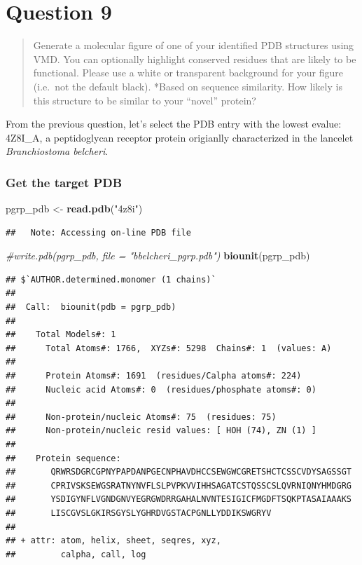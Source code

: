 \documentclass[]{article}
\newenvironment{Shaded}{\begin{snugshade}}{\end{snugshade}}
\newcommand{\KeywordTok}[1]{\textcolor[rgb]{0.13,0.29,0.53}{\textbf{#1}}}
\newcommand{\StringTok}[1]{\textcolor[rgb]{0.31,0.60,0.02}{#1}}
\newcommand{\CommentTok}[1]{\textcolor[rgb]{0.56,0.35,0.01}{\textit{#1}}}
\newcommand{\NormalTok}[1]{#1}
\begin{document}
\section{Question 9}\label{question-9}

\begin{quote}
Generate a molecular figure of one of your identified PDB structures
using VMD. You can optionally highlight conserved residues that are
likely to be functional. Please use a white or transparent background
for your figure (i.e.~not the default black). *Based on sequence
similarity. How likely is this structure to be similar to your ``novel''
protein?
\end{quote}

From the previous question, let's select the PDB entry with the lowest
evalue: 4Z8I\_A, a peptidoglycan receptor protein origianlly
characterized in the lancelet \emph{Branchiostoma belcheri}.

\subsubsection{Get the target PDB}\label{get-the-target-pdb}

\begin{Shaded}
\begin{Highlighting}[]
\NormalTok{pgrp_pdb <-}\StringTok{ }\KeywordTok{read.pdb}\NormalTok{(}\StringTok{"4z8i"}\NormalTok{)}
\end{Highlighting}
\end{Shaded}

\begin{verbatim}
##   Note: Accessing on-line PDB file
\end{verbatim}

\begin{Shaded}
\begin{Highlighting}[]
\CommentTok{#write.pdb(pgrp_pdb, file = "bbelcheri_pgrp.pdb")}
\KeywordTok{biounit}\NormalTok{(pgrp_pdb)}
\end{Highlighting}
\end{Shaded}

\begin{verbatim}
## $`AUTHOR.determined.monomer (1 chains)`
## 
##  Call:  biounit(pdb = pgrp_pdb)
## 
##    Total Models#: 1
##      Total Atoms#: 1766,  XYZs#: 5298  Chains#: 1  (values: A)
## 
##      Protein Atoms#: 1691  (residues/Calpha atoms#: 224)
##      Nucleic acid Atoms#: 0  (residues/phosphate atoms#: 0)
## 
##      Non-protein/nucleic Atoms#: 75  (residues: 75)
##      Non-protein/nucleic resid values: [ HOH (74), ZN (1) ]
## 
##    Protein sequence:
##       QRWRSDGRCGPNYPAPDANPGECNPHAVDHCCSEWGWCGRETSHCTCSSCVDYSAGSSGT
##       CPRIVSKSEWGSRATNYNVFLSLPVPKVVIHHSAGATCSTQSSCSLQVRNIQNYHMDGRG
##       YSDIGYNFLVGNDGNVYEGRGWDRRGAHALNVNTESIGICFMGDFTSQKPTASAIAAAKS
##       LISCGVSLGKIRSGYSLYGHRDVGSTACPGNLLYDDIKSWGRYV
## 
## + attr: atom, helix, sheet, seqres, xyz,
##         calpha, call, log
\end{verbatim}
\end{document}
